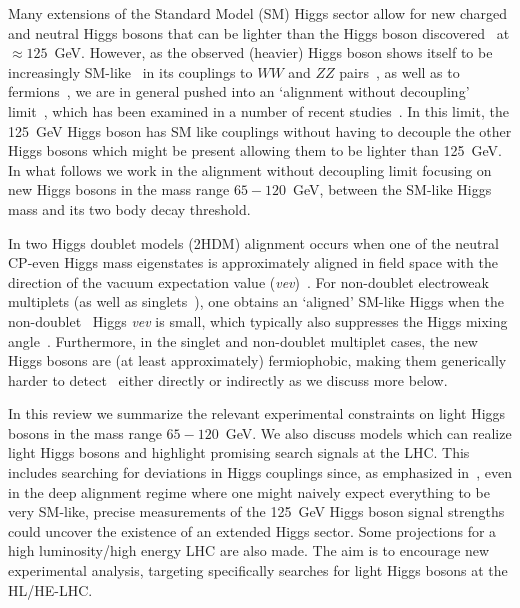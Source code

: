 \documentclass[../report.tex]{subfiles}
\begin{document}
Many extensions of the Standard Model (SM) Higgs sector allow for new
charged and neutral Higgs bosons that can be lighter than the Higgs
boson discovered~\cite{Aad:2012tfa,Chatrchyan:2012xdj} at $\approx 125$~GeV. 
However, as the observed (heavier) Higgs boson shows itself to be 
increasingly SM-like~\cite{Falkowski:2013dza} in its couplings to $WW$
and $ZZ$ pairs~\cite{Khachatryan:2014kca,Khachatryan:2016vau,Sirunyan:2017exp,Sirunyan:2017tqd,Aaboud:2017oem,Falkowski:2013dza},
as well as to fermions~\cite{Aaboud:2018zhk,CMS:2018abb}, we are in
general pushed into an `alignment without decoupling'
limit~\cite{Gunion:2002zf,Carena:2013ooa}, which has been examined in a
number of recent
studies~\cite{Craig:2013hca,Carena:2014nza,Carena:2015moc,Bernon:2015wef,Profumo:2016zxo,Bechtle:2016kui,Haber:2017erd,Bahl:2018zmf}. In
this limit, the 125~GeV Higgs boson has SM like couplings without having
to decouple the other Higgs bosons which might be present allowing them
to be lighter than 125~GeV. In what follows we work in the alignment
without decoupling limit focusing on new Higgs bosons in the mass range
$65 - 120$~GeV, between the SM-like Higgs mass and its two body decay
threshold. 

In two Higgs doublet models (2HDM) alignment occurs when one of the
neutral CP-even Higgs mass eigenstates is approximately aligned in field
space with the direction of the vacuum expectation value
(\emph{vev})~\cite{Carena:2013ooa,Bernon:2015wef}. For non-doublet
electroweak multiplets (as well as singlets~\cite{Robens:2015gla}), one
obtains an `aligned' SM-like Higgs when the
non-doublet~\cite{Georgi:1985nv,Killick:2013mya} Higgs \emph{vev} is
small, which typically also suppresses the Higgs mixing
angle~\cite{Haber:1978jt,Hartling:2014zca}. Furthermore, in the singlet
and non-doublet multiplet cases, the new Higgs bosons are (at least
approximately) fermiophobic, making them generically harder to
detect~\cite{Akeroyd:1998ui,Akeroyd:1995hg,Delgado:2016arn,Vega:2018ddp}
either directly or indirectly as we discuss more below.  

In this review we summarize the relevant experimental constraints on
light Higgs bosons in the mass range $65 - 120$~GeV. We also discuss
models which can realize light Higgs bosons and highlight promising
search signals at the LHC. This includes searching for deviations in
Higgs couplings since, as emphasized in~\cite{Bernon:2015wef}, even in
the deep alignment regime where one might naively expect everything to
be very SM-like, precise measurements of the 125~GeV Higgs boson signal
strengths could uncover the existence of an extended Higgs sector. Some
projections for a high luminosity/high energy LHC are also made. 
The aim is to encourage new experimental analysis, targeting
specifically searches for light Higgs bosons at the HL/HE-LHC.
\end{document}
